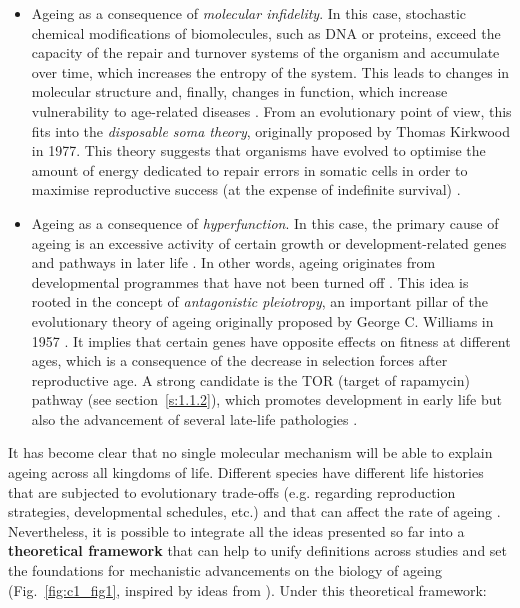 \begin{itemize}
	
	\item Ageing as a consequence of \textit{molecular infidelity}. In this case, stochastic chemical modifications of biomolecules, such as DNA or proteins, exceed the capacity of the repair and turnover systems of the organism and accumulate over time, which increases the entropy of the system. This leads to changes in molecular structure and, finally, changes in function, which increase vulnerability to age-related diseases \cite{Hayflick2007,Hayflick2007a}. From an evolutionary point of view, this fits into the \textit{disposable soma theory}, originally proposed by Thomas Kirkwood in 1977. This theory suggests that organisms have evolved to optimise the amount of energy dedicated to repair errors in somatic cells in order to maximise reproductive success (at the expense of indefinite survival) \cite{Kirkwood1977,Kirkwood1991}. 
	
	\item Ageing as a consequence of \textit{hyperfunction}. In this case, the primary cause of ageing is an excessive activity of certain growth or development-related genes and pathways in later life \cite{Blagosklonny2006,Blagosklonny2010,DeMagalhaes2012,Gems2015}. In other words, ageing originates from developmental programmes that have not been turned off \cite{Blagosklonny2006}. This idea is rooted in the concept of \textit{antagonistic pleiotropy}, an important pillar of the evolutionary theory of ageing originally proposed by George C. Williams in 1957 \cite{Williams1957}. It implies that certain genes have opposite effects on fitness at different ages, which is a consequence of the decrease in selection forces after reproductive age. A strong candidate is the \acrshort{TOR} (target of rapamycin) pathway (see section~\ref{s:1.1.2}), which promotes development in early life but also the advancement of several late-life pathologies \cite{Blagosklonny2010}. 
	
\end{itemize}

It has become clear that no single molecular mechanism will be able to explain ageing across all kingdoms of life. Different species have different life histories that are subjected to evolutionary trade-offs (e.g. regarding reproduction strategies, developmental schedules, etc.) and that can affect the rate of ageing \cite{Jones2013,Ricklefs2010}. Nevertheless, it is possible to integrate all the ideas presented so far into a \textbf{theoretical framework} that can help to unify definitions across studies and set the foundations for mechanistic advancements on the biology of ageing (Fig.~\ref{fig:c1_fig1}, inspired by ideas from \cite{Hayflick2007,Gems2015,Peto1997,Stroustrup2016,Freund2019}). Under this theoretical framework: 

